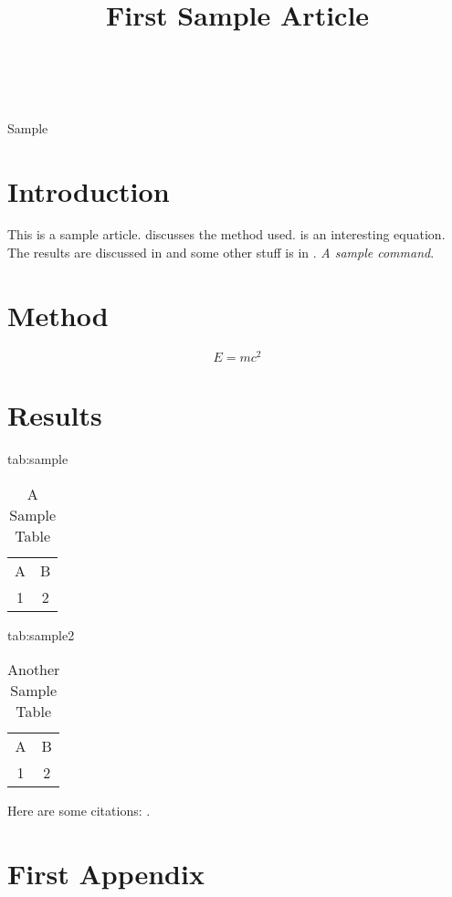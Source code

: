 \documentclass[wcp]{jmlr}
\title[Article 1]{First Sample Article}
\author{\Name{Jane Doe}\Email{jd@sample.com}\and
\Name{John {Smith Jones}}\Email{jsj@sample.com}\\
\addr{University of No Where}}
\newcommand{\samplecommand}{\emph{A sample command}}
\begin{document}
\maketitle

\begin{abstract}
\lipsum[1]
\end{abstract}
\begin{keywords}
Sample
\end{keywords}

\section{Introduction}

This is a sample article.  discusses
the method used.  is an interesting 
equation. The results are discussed in 
and some other stuff is in .
\samplecommand.

\lipsum

\section{Method}\label{sec:method}

\lipsum

\begin{equation}\label{eq:emc2}
E = mc^2
\end{equation}

\section{Results}\label{sec:results}

\begin{table}[htbp]
\floatconts
  {tab:sample}
  {\caption{A Sample Table}}
  {%
    \begin{tabular}{cc}
    A & B\\
    1 & 2
    \end{tabular}
  }%
\end{table}

\begin{table}[htbp]
\floatconts
  {tab:sample2}
  {\caption{Another Sample Table}}
  {%
    \begin{tabular}{cc}
    A & B\\
    1 & 2
    \end{tabular}
  }%
\end{table}

\lipsum

Here are some citations: \citet{guyon-elisseeff-03,guyon2007causalreport}.



\appendix
\section{First Appendix}\label{apd:first}

\lipsum
\end{document}
